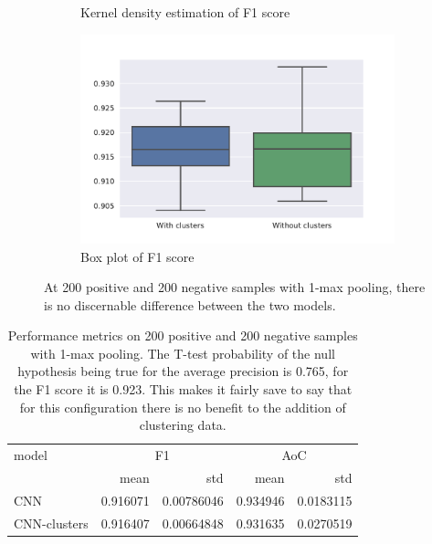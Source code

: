 \begin{figure}[htb]
\begin{subfigure}[b]{0.49\textwidth}
    \caption{Kernel density estimation of F1 score}
  \end{subfigure}
  \begin{subfigure}[b]{0.49\textwidth}
	\centering
    \includegraphics[width=\textwidth]{figures/results/datasize/200pos_10fold_default_boxplot_f1.pdf}
    \caption{Box plot of F1 score}
  \end{subfigure}
  \caption{At 200 positive and 200 negative samples with 1-max pooling, there is
    no discernable difference between the two models.}
  \label{fig:200_1max}
\end{figure}

\begin{table}[htb]
  \centering
  \begin{tabular}{lrrrr}
    \toprule
    model & \multicolumn{2}{c}{F1} & \multicolumn{2}{c}{AoC} \\
    \cmidrule(l){2-3} \cmidrule(l){4-5}
    & mean & std & mean & std \\
    \midrule
    CNN & 0.916071 & 0.00786046 & 0.934946 & 0.0183115 \\
    CNN-clusters & 0.916407 & 0.00664848 & 0.931635 & 0.0270519 \\
    \bottomrule
  \end{tabular}
  \caption{Performance metrics on 200 positive and 200 negative samples with
    1-max pooling. The T-test probability of the null hypothesis being true for
    the average precision is 0.765, for the F1 score it is 0.923. This makes it
    fairly save to say that for this configuration there is no benefit to the
    addition of clustering data.
    }
  \label{tbl:200pos_1max}
\end{table}

\FloatBarrier

